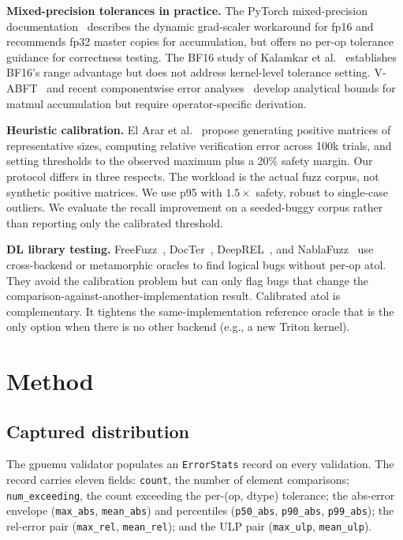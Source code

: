 \documentclass[runningheads]{llncs}
\begin{document}
\textbf{Mixed-precision tolerances in practice.} The PyTorch
mixed-precision documentation~\cite{pytorchmixedprec} describes the
dynamic grad-scaler workaround for fp16 and recommends fp32 master
copies for accumulation, but offers no per-op tolerance guidance for
correctness testing. The BF16 study of Kalamkar et
al.~\cite{bfloat16study} establishes BF16's range advantage but does
not address kernel-level tolerance setting.
V-ABFT~\cite{vabft2026} and recent componentwise error
analyses~\cite{mixedaccum2025} develop analytical bounds for matmul
accumulation but require operator-specific derivation.

\textbf{Heuristic calibration.} El Arar et al.~\cite{mixedaccum2025}
propose generating positive matrices of representative sizes, computing
relative verification error across 100k trials, and setting thresholds
to the observed maximum plus a 20\% safety margin. Our protocol differs
in three respects. The workload is the actual fuzz corpus, not synthetic
positive matrices. We use p95 with $1.5\times$ safety, robust to
single-case outliers. We evaluate the recall improvement on a
seeded-buggy corpus rather than reporting only the calibrated threshold.

\textbf{DL library testing.} FreeFuzz~\cite{freefuzz2022},
DocTer~\cite{docter2022}, DeepREL~\cite{deeprel2022}, and
NablaFuzz~\cite{nablafuzz2023} use cross-backend or metamorphic oracles
to find logical bugs without per-op atol. They avoid the calibration
problem but can only flag bugs that change the
comparison-against-another-implementation result. Calibrated atol is
complementary. It tightens the same-implementation reference oracle
that is the only option when there is no other backend (e.g., a new
Triton kernel).

\section{Method}
\label{sec:method}

\subsection{Captured distribution}
\label{sec:method:dist}

The gpuemu validator populates an \texttt{ErrorStats} record on every
validation. The record carries eleven fields: \texttt{count}, the
number of element comparisons; \texttt{num\_exceeding}, the count
exceeding the per-(op, dtype) tolerance; the abs-error envelope
(\texttt{max\_abs}, \texttt{mean\_abs}) and percentiles
(\texttt{p50\_abs}, \texttt{p90\_abs}, \texttt{p99\_abs}); the
rel-error pair (\texttt{max\_rel}, \texttt{mean\_rel}); and the ULP
pair (\texttt{max\_ulp}, \texttt{mean\_ulp}).
\end{document}
